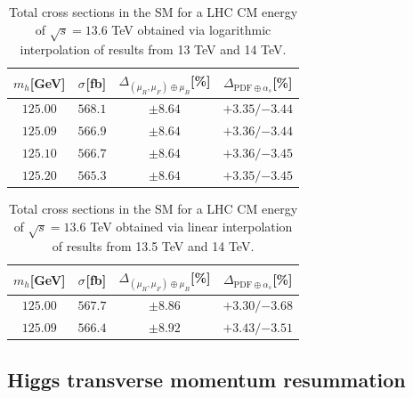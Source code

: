 \documentclass[11pt,a4paper]{article}
\begin{document}
\begin{table}[ht!]
\begin{center}%
\begin{small}%
\begin{tabular}{cccc}%
$m_h$[GeV] & $\sigma^{}$[fb] & $\Delta_{\left(\mu_{R},\mu_{F}\right)\oplus\mu_{B}}$[\%] & $\Delta_{\mathrm{PDF}\oplus\alpha_s}$[\%]  \\\hline
$125.00$ & $568.1$ & $\pm8.64$ & ${{+3.35}}/{-3.44}$ \\
$125.09$ & $566.9$ & $\pm8.64$ & ${{+3.36}}/{-3.44}$ \\
$125.10$ & $566.7$ & $\pm8.64$ & ${{+3.36}}/{-3.45}$ \\
$125.20$ & $565.3$ & $\pm8.64$ & ${{+3.35}}/{-3.45}$ 
\end{tabular}%
\end{small}%
\end{center}%
\caption{Total \bbH{} cross sections in the SM for a LHC CM energy of $\sqrt{s}=13.6$ TeV obtained via logarithmic interpolation of results from 13 TeV and 14 TeV.}
\label{tab:bbH136log}
\end{table}

\begin{table}[ht!]
\begin{center}%
\begin{small}%
\begin{tabular}{cccc}%
$m_h$[GeV] & $\sigma^{}$[fb] & $\Delta_{\left(\mu_{R},\mu_{F}\right)\oplus\mu_{B}}$[\%] & $\Delta_{\mathrm{PDF}\oplus\alpha_s}$[\%]  \\\hline
$125.00$ & $567.7$ & $\pm8.86$ & ${{+3.30}}/{-3.68}$ \\
$125.09$ & $566.4$ & $\pm8.92$ & ${{+3.43}}/{-3.51}$ 
\end{tabular}%
\end{small}%
\end{center}%
\caption{Total \bbH{} cross sections in the SM for a LHC CM energy of $\sqrt{s}=13.6$ TeV obtained via linear interpolation of results from 13.5 TeV and 14 TeV.}
\label{tab:bbH136linalt}
\end{table}

\subsection{Higgs transverse momentum resummation}\label{sec:resummation}
\end{document}
